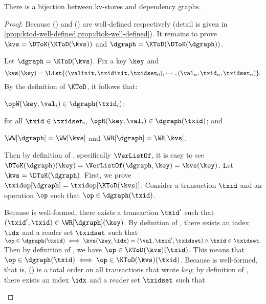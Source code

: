 \begin{theorem}
\label{thm:isomorphism-kvstore-dgraph}
There is a bijection between kv-stores and dependency graphs.
\end{theorem}
\begin{proof}
Because \KToD(\kvs) and \DToK(\dgraph) are well-defined respectively 
(detail is given in \cref{prop:ktod-well-defined,prop:dtok-well-defined}).
It remains to prove \( \kvs = \DToK(\KToD(\kvs)) \) and \( \dgraph = \KToD(\DToK(\dgraph)) \).
\begin{enumerate}
\Case{\kvs = \DToK(\KToD(\kvs))}
    Let \( \dgraph  = \KToD(\kvs) \).
    Fix a key \( \key \) and 
    \[ \kvs(\key) = \List{(\valinit,\txidinit,\txidset_0), \cdots,(\val_n,\txid_n,\txidset_n) }. \]
    By the definition of \(\KToD\), it follows that:
    \begin{enumerate*} \item \( \opW(\key,\val_i) \in \dgraph(\txid_i) \);
    \item for all \( \txid \in \txidset_i \), \( \opR(\key,\val_i) \in \dgraph(\txid) \); and
    \item \( \WW[\dgraph] = \WW[\kvs] \) and \( \WR[\dgraph] = \WR[\kvs] \).
    \end{enumerate*}
    Then by definition of \DToK, specifically \( \VerListOf \), 
    it is easy to see \( \DToK(\dgraph)(\key) = \VerListOf(\dgraph,\key) = \kvs(\key) \).
\Case{\dgraph = \KToD(\DToK(\dgraph))}
    Let \( \kvs  = \DToK(\dgraph) \).
    First, we prove \( \txidop[\dgraph] = \txidop[\KToD(\kvs)] \).
    Consider a transaction \( \txid \) and an operation \( \op \) such that \( \op \in \dgraph(\txid)\).
    \begin{enumerate}
    \Case{\(\op = \opR(\key,\val)\)}
        Because \dgraph is well-formed, there exists a transaction \( \txid' \) such that
        \( (\txid',\txid) \in \WR[\dgraph](\key) \).
        By definition of \DToK,
        there exists an index \( \idx \) and a reader set \( \txidset \) such that 
        \( 
        \op \in \dgraph(\txid) \iff \kvs(\key,\idx) = (\val,\txid',\txidset) \land \txid \in \txidset .
        \)
        Then by definition of \KToD, we have \( \op \in \KToD(\kvs)(\txid)\).
        This means that \( \op \in \dgraph(\txid) \iff \op \in \KToD(\kvs)(\txid)\).
    \Case{\(\op = \opW(\key,\val)\)}
        Because \dgraph is well-formed, that is, \WW[\dgraph](\key) is 
        a total order on all transactions that wrote \( key \);
        by definition of \DToK,
        there exists an index \( \idx \) and a reader set \( \txidset \)  such that 

\end{enumerate}
\end{enumerate}
\end{proof}
